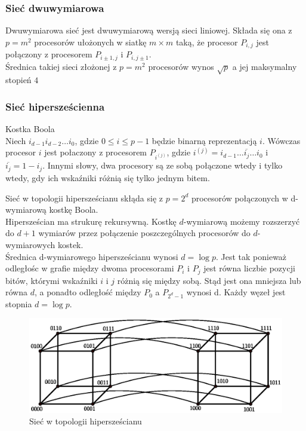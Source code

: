 \subsubsection{Sieć dwuwymiarowa}

Dwuwymiarowa sieć jest dwuwymiarową wersją sieci liniowej. Składa się ona z \(p=m^2\) procesorów ułożonych w siatkę \(m\times m\) taką, że procesor \(P_{i,j}\) jest połączony z procesorem \(P_{i\pm 1, j}\) i \(P_{i, j\pm 1}\).\\
Średnica takiej sieci złożonej z \(p=m^2\) procesorów wynos \(\sqrt{p}\) a jej maksymalny stopień \(4\)


\subsubsection{Sieć hipersześcienna}

\begin{definicja}{Kostka Boola}\\
Niech \(i_{d-1}i_{d-2}\dots i_{0}\), gdzie \(0\leq i \leq p-1\) będzie binarną reprezentacją \(i\). Wówczas procesor \({i}\) jest połaczony z procesorem \(P_{i^(j)}\), gdzie \(i^{(j)}=i_{d-1}\dots \overline{i_j} \dots i_0\) i \(\overline{i_j} = 1 - i_j\). Innymi słowy, dwa procesory są ze sobą połączone wtedy i tylko wtedy, gdy ich wskaźniki różnią się tylko jednym bitem.\\
\end{definicja}

Sieć w topologii hipersześcianu skłąda się z \(p=2^d\) procesorów połączonych w d-wymiarową kostkę Boola.\\

Hipersześcian ma strukurę rekursywną. Kostkę \(d\)-wymiarową możemy rozszerzyć do \(d+1\) wymiarów przez połączenie poszczególnych procesorów do \(d\)-wymiarowych kostek.\\

Średnica d-wymiarowego hipersześcianu wynosi \(d=\log{p}\). Jest tak ponieważ odległośc w grafie między dwoma procesorami \(P_i\) i \(P_j\) jest równa liczbie pozycji bitów, którymi wskaźniki \(i\) i \(j\) różnią się między sobą. Stąd jest ona mniejsza lub równa \(d\), a ponadto odległość między \(P_0\) a \(P_{2^d-1}\) wynosi d. Każdy węzeł jest stopnia \(d=\log{p}\).

\begin{figure}[h]
\centering
\includegraphics[width=36em]{./images/systolic.eps}
\caption{Sieć w topologii hipersześcianu}
\label{fig:systolic}
\end{figure}